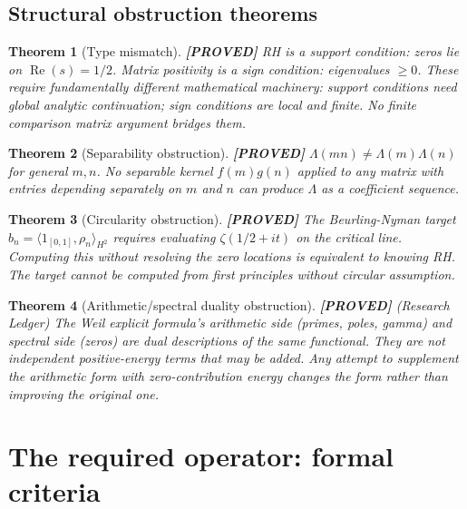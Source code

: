 \documentclass[11pt]{article}
\newtheorem{theorem}{Theorem}[section]
\theoremstyle{remark}
\newcommand{\PROVED}{\textbf{\color{blue}[PROVED]}}
\begin{document}
\subsection{Structural obstruction theorems}

\begin{theorem}[Type mismatch] \PROVED{}
RH is a \emph{support condition}: zeros lie on $\operatorname{Re}(s) = 1/2$.
Matrix positivity is a \emph{sign condition}: eigenvalues $\geq 0$.
These require fundamentally different mathematical machinery:
support conditions need global analytic continuation;
sign conditions are local and finite.
No finite comparison matrix argument bridges them.
\end{theorem}

\begin{theorem}[Separability obstruction] \PROVED{}
$\Lambda(mn) \neq \Lambda(m)\Lambda(n)$ for general $m,n$.
No separable kernel $f(m)g(n)$ applied to any matrix with entries depending
separately on $m$ and $n$ can produce $\Lambda$ as a coefficient sequence.
\end{theorem}

\begin{theorem}[Circularity obstruction] \PROVED{}
The Beurling-Nyman target $b_n = \langle 1_{[0,1]}, \rho_n\rangle_{H^2}$ requires
evaluating $\zeta(1/2+it)$ on the critical line.
Computing this without resolving the zero locations is equivalent to knowing RH.
The target cannot be computed from first principles without circular assumption.
\end{theorem}

\begin{theorem}[Arithmetic/spectral duality obstruction] \PROVED{} (Research Ledger)
The Weil explicit formula's arithmetic side (primes, poles, gamma) and spectral side (zeros)
are dual descriptions of the same functional. They are not independent positive-energy terms
that may be added. Any attempt to supplement the arithmetic form with zero-contribution
energy changes the form rather than improving the original one.
\end{theorem}

\section{The required operator: formal criteria}
\end{document}
